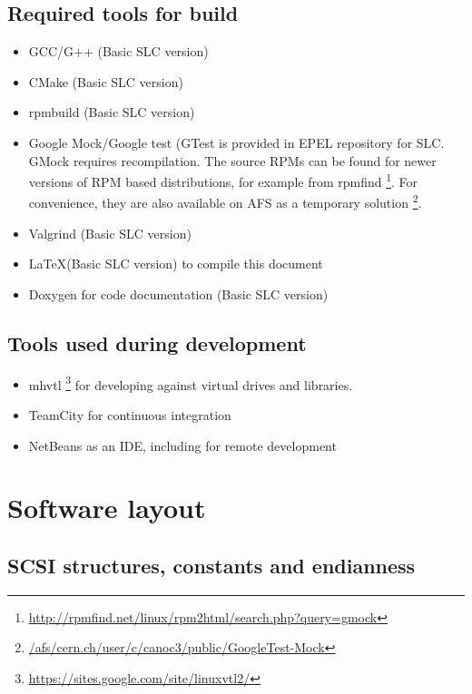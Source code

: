 \subsection{Required tools for build}
\begin{itemize}
\item{}GCC/G++ (Basic SLC version)
\item{}CMake (Basic SLC version)
\item{}rpmbuild (Basic SLC version)
\item{}Google Mock/Google test (GTest is provided in EPEL repository for SLC. 
  GMock requires recompilation. The source RPMs can be found for newer versions of RPM based distributions, for example from rpmfind 
  \footnote{ \href{http://rpmfind.net/linux/rpm2html/search.php?query=gmock}{http://rpmfind.net/linux/rpm2html/search.php?query=gmock} }.
 For convenience, 
  they are also available on AFS as a temporary solution
      \footnote{ \href{file:///afs/cern.ch/user/c/canoc3/public/GoogleTest-Mock}{/afs/cern.ch/user/c/canoc3/public/GoogleTest-Mock} }.
\item{}Valgrind (Basic SLC version)
\item{}\LaTeX (Basic SLC version) to compile this document
\item{}Doxygen for code documentation (Basic SLC version)
\end{itemize}

\subsection{Tools used during development}
\begin{itemize}
\item{}mhvtl \footnote{ \href{https://sites.google.com/site/linuxvtl2/}{https://sites.google.com/site/linuxvtl2/} } for developing against virtual drives and libraries.
\item{}TeamCity for continuous integration
\item{}NetBeans as an IDE, including for remote development\
\end{itemize}

\section{Software layout}

\subsection{SCSI structures, constants and endianness}

